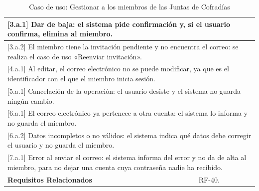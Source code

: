 \begin{table}[h!]
\begin{tabular}{|p{4cm}|p{11cm}|}
        \hline
        \multicolumn{2}{|p{15cm}|}{ [3.a.1] Dar de baja: el sistema pide confirmación y, si el usuario confirma, elimina al miembro. } \\
        \hline
        \multicolumn{2}{|p{15cm}|}{ [3.a.2] El miembro tiene la invitación pendiente y no encuentra el correo: se realiza el caso de uso «Reenviar invitación». } \\
        \hline
        \multicolumn{2}{|p{15cm}|}{ [4.a.1] Al editar, el correo electrónico no se puede modificar, ya que es el identificador con el que el miembro inicia sesión. } \\
        \hline
        \multicolumn{2}{|p{15cm}|}{ [5.a.1] Cancelación de la operación: el usuario desiste y el sistema no guarda ningún cambio. } \\
        \hline
        \multicolumn{2}{|p{15cm}|}{ [6.a.1] El correo electrónico ya pertenece a otra cuenta: el sistema lo informa y no guarda el miembro. } \\
        \hline
        \multicolumn{2}{|p{15cm}|}{ [6.a.2] Datos incompletos o no válidos: el sistema indica qué datos debe corregir el usuario y no guarda el miembro. } \\
        \hline
        \multicolumn{2}{|p{15cm}|}{ [7.a.1] Error al enviar el correo: el sistema informa del error y no da de alta al miembro, para no dejar una cuenta cuya contraseña nadie ha recibido. } \\
        \hline
        \textbf{Requisitos Relacionados} & RF-40. \\
        \hline
    \end{tabular}
    \caption{Caso de uso: Gestionar a los miembros de las Juntas de Cofradías}
\end{table}


